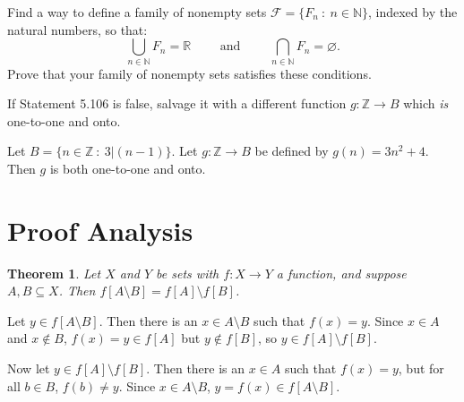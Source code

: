 \documentclass[12pt]{article}
\def\Z{{\mathbb Z}}
\def\R{{\mathbb R}}
\def\N{{\mathbb N}}
\theoremstyle{plain}
\newtheorem{thm}{Theorem}
\theoremstyle{definition}
\newenvironment{statement}[1]
  {\renewcommand\theinnerstatement{#1}\innerstatement}
  {\endinnerstatement}
\newenvironment{expl}[1]
  {\renewcommand\theinnerexploration{#1}\innerexploration}
  {\endinnerexploration}
\renewenvironment{proof}[1][\proofname]{\begin{trivlist}\pushQED{\qed}\item[\hskip \labelsep  \bfseries #1{}.\hspace{10pt}]}
{\popQED\end{trivlist}}
\begin{document}
\begin{proof}

\end{proof}

\begin{expl}{4.122}
	Find a way to define a family of nonempty sets $\mathcal{F} = \{ F_n \ : \ n\in \N\}$, indexed by the natural numbers, so that:
	\[
		\bigcup\limits_{n\in\N} F_n = \R \qquad \text{ and } \qquad \bigcap\limits_{n\in \N} F_n = \varnothing.
	\]
	Prove that your family of nonempty sets satisfies these conditions.
\end{expl}

\begin{proof}

\end{proof}

If Statement 5.106 is false, salvage it with a different function $g : \Z\to B$ which \emph{is} one-to-one and onto.

\begin{statement}{5.106}
	Let $B = \{n\in \Z \ : \  3|(n-1)\}$.
	Let $g : \Z\to B$ be defined by $g(n) = 3n^2 + 4$.
	Then $g$ is both one-to-one and onto.
\end{statement}


\begin{proof}

\end{proof}

\newpage


\section{Proof Analysis}

\begin{thm}
	Let $X$ and $Y$ be sets with $f : X\to Y$ a function, and suppose $A,B\subseteq X$.
	Then $f[A\setminus B] = f[A]\setminus f[B]$.
\end{thm}

\begin{proof}
	Let $y\in f[A\setminus B]$.
	Then there is an $x\in A\setminus B$ such that $f(x) = y$.
	Since $x\in A$ and $x\notin B$, $f(x) = y\in f[A]$ but $y\notin f[B]$, so $y\in f[A]\setminus f[B]$.
	
	Now let $y\in f[A]\setminus f[B]$.
	Then there is an $x\in A$ such that $f(x) = y$, but for all $b\in B$, $f(b)\ne y$.
	Since $x\in A\setminus B$, $y = f(x) \in f[A\setminus B]$.
\end{proof}
\end{document}
